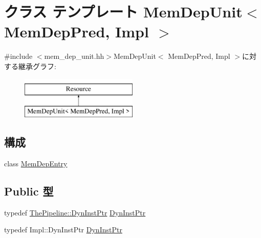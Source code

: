 \hypertarget{classMemDepUnit}{
\section{クラス テンプレート MemDepUnit$<$ MemDepPred, Impl $>$}
\label{classMemDepUnit}
}


{\ttfamily \#include $<$mem\_\-dep\_\-unit.hh$>$}MemDepUnit$<$ MemDepPred, Impl $>$に対する継承グラフ:\begin{figure}[H]
\begin{center}
\leavevmode
\includegraphics[height=2cm]{classMemDepUnit}
\end{center}
\end{figure}
\subsection*{構成}
\begin{DoxyCompactItemize}
\item 
class \hyperlink{classMemDepUnit_1_1MemDepEntry}{MemDepEntry}
\end{DoxyCompactItemize}
\subsection*{Public 型}
\begin{DoxyCompactItemize}
\item 
typedef \hyperlink{classRefCountingPtr}{ThePipeline::DynInstPtr} \hyperlink{classMemDepUnit_af9d0c8a46736ba6aa2d8bb94da1a5e73}{DynInstPtr}
\item 
typedef Impl::DynInstPtr \hyperlink{classMemDepUnit_a028ce10889c5f6450239d9e9a7347976}{DynInstPtr}
\end{DoxyCompactItemize}

